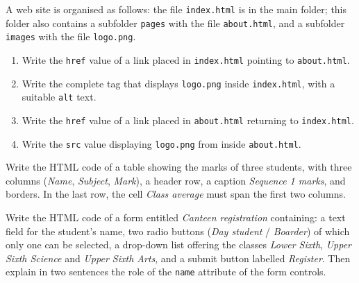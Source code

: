 \documentclass[11pt]{article}
\newcounter{popsec}
\newcounter{popsub}
\newcommand{\courssub}[1]{%
  \stepcounter{popsub}%
  \par\vspace{9pt}\noindent{\popxbold\fontsize{11.5}{13}\selectfont\color{popink}{\color{poporange}\thepopsec.\thepopsub}\hspace{6pt}#1}\par\nopagebreak\vspace{4pt}
}
\begin{document}
\begin{exercice}
A web site is organised as follows: the file \texttt{index.html} is in the main folder; this folder also contains a subfolder \texttt{pages} with the file \texttt{about.html}, and a subfolder \texttt{images} with the file \texttt{logo.png}.
\begin{enumerate}
\item Write the \texttt{href} value of a link placed in \texttt{index.html} pointing to \texttt{about.html}.
\item Write the complete tag that displays \texttt{logo.png} inside \texttt{index.html}, with a suitable \texttt{alt} text.
\item Write the \texttt{href} value of a link placed in \texttt{about.html} returning to \texttt{index.html}.
\item Write the \texttt{src} value displaying \texttt{logo.png} from inside \texttt{about.html}.
\end{enumerate}
\end{exercice}

\begin{exercice}
Write the HTML code of a table showing the marks of three students, with three columns (\emph{Name}, \emph{Subject}, \emph{Mark}), a header row, a caption \emph{Sequence 1 marks}, and borders. In the last row, the cell \emph{Class average} must span the first two columns.
\end{exercice}

\begin{exercice}
Write the HTML code of a form entitled \emph{Canteen registration} containing: a text field for the student's name, two radio buttons (\emph{Day student} / \emph{Boarder}) of which only one can be selected, a drop-down list offering the classes \emph{Lower Sixth}, \emph{Upper Sixth Science} and \emph{Upper Sixth Arts}, and a submit button labelled \emph{Register}. Then explain in two sentences the role of the \texttt{name} attribute of the form controls.
\end{exercice}

\courssub{I prepare for the GCE}
\end{document}
